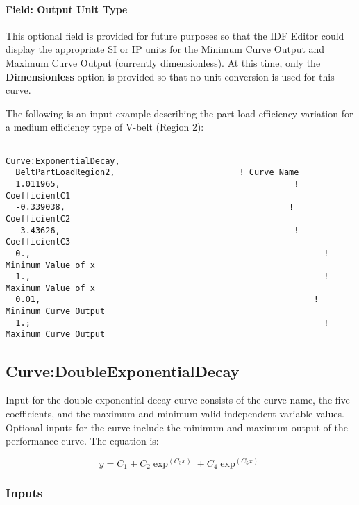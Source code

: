 \paragraph{Field: Output Unit Type}\label{field-output-unit-type-15}

This optional field is provided for future purposes so that the IDF Editor could display the appropriate SI or IP units for the Minimum Curve Output and Maximum Curve Output (currently dimensionless). At this time, only the \textbf{Dimensionless} option is provided so that no unit conversion is used for this curve.

The following is an input example describing the part-load efficiency variation for a medium efficiency type of V-belt (Region 2):

\begin{lstlisting}

Curve:ExponentialDecay,
  BeltPartLoadRegion2,                         ! Curve Name
  1.011965,                                               ! CoefficientC1
  -0.339038,                                             ! CoefficientC2
  -3.43626,                                               ! CoefficientC3
  0.,                                                           ! Minimum Value of x
  1.,                                                           ! Maximum Value of x
  0.01,                                                       ! Minimum Curve Output
  1.;                                                           ! Maximum Curve Output
\end{lstlisting}

\subsection{Curve:DoubleExponentialDecay}\label{curvedoubleexponentialdecay}

Input for the double exponential decay curve consists of the curve name, the five coefficients, and the maximum and minimum valid independent variable values. Optional inputs for the curve include the minimum and maximum output of the performance curve. The equation is:

\begin{equation}
y = {C_1} + {C_2}{\exp ^{({C_3}x)}} + {C_4}{\exp ^{({C_5}x)}}
\end{equation}

\subsubsection{Inputs}\label{inputs-18-005}

